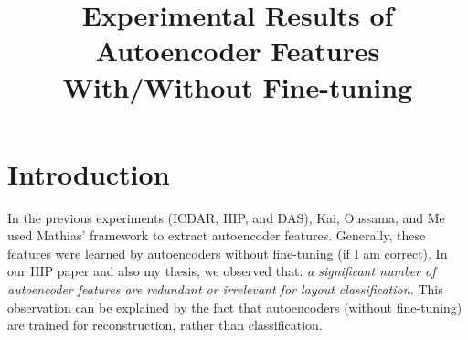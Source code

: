 \documentclass[conference]{IEEEtran}
\begin{document}
%

\title{Experimental Results of Autoencoder Features With/Without Fine-tuning}


\begin{comment}

\author{\IEEEauthorblockN{Michael Shell}
\IEEEauthorblockA{School of Electrical and\\Computer Engineering\\
Georgia Institute of Technology\\
Atlanta, Georgia 30332--0250\\
Email: http://www.michaelshell.org/contact.html}
\and
\IEEEauthorblockN{Homer Simpson}
\IEEEauthorblockA{Twentieth Century Fox\\
Springfield, USA\\
Email: homer@thesimpsons.com}
\and
\IEEEauthorblockN{James Kirk\\ and Montgomery Scott}
\IEEEauthorblockA{Starfleet Academy\\
San Francisco, California 96678--2391\\
Telephone: (800) 555--1212\\
Fax: (888) 555--1212}}

\end{comment}


\maketitle

\begin{abstract}

\end{abstract}




\IEEEpeerreviewmaketitle



\section{Introduction}



In the previous experiments (ICDAR, HIP, and DAS), Kai, Oussama, and Me used Mathias' framework to extract autoencoder features.
Generally, these features were learned by autoencoders without fine-tuning (if I am correct).
In our HIP paper and also my thesis, we observed that: \textit{a significant number of autoencoder features are redundant or irrelevant for layout classification.}
This observation can be explained by the fact that autoencoders (without fine-tuning) are trained for reconstruction, rather than classification.
\end{document}
